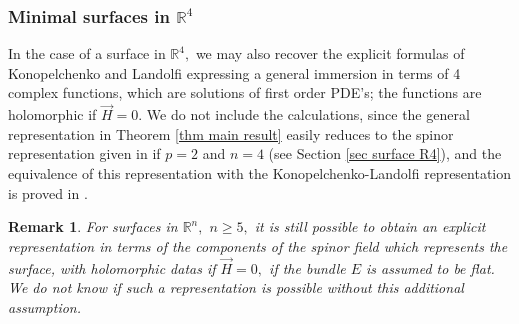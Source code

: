 \documentclass{amsart}
\newtheorem{rem}{Remark}
\begin{document}
\subsubsection{Minimal surfaces in ${\mathbb{R}}^4$} In the case of a surface in ${\mathbb{R}}^4,$ we may also recover the explicit formulas of Konopelchenko and Landolfi \cite{KL} expressing a general immersion in terms of 4 complex functions, which are solutions of first order PDE's; the functions are holomorphic if $\vec{H}=0$. We do not include the calculations, since the general representation in Theorem \ref{thm main result} easily reduces to the spinor representation given in \cite{BLR} if $p=2$ and $n=4$ (see Section \ref{sec surface R4}), and the equivalence of this representation with the Konopelchenko-Landolfi representation is proved in \cite{RR}.
\begin{rem}
For surfaces in ${\mathbb{R}}^n,$ $n\geq 5,$ it is still possible to obtain an explicit representation in terms of the components of the spinor field which represents the surface, with holomorphic datas if $\vec H=0,$ if the bundle $E$ is assumed to be flat. We do not know if such a representation is possible without this additional assumption.   
\end{rem}
\end{document}
